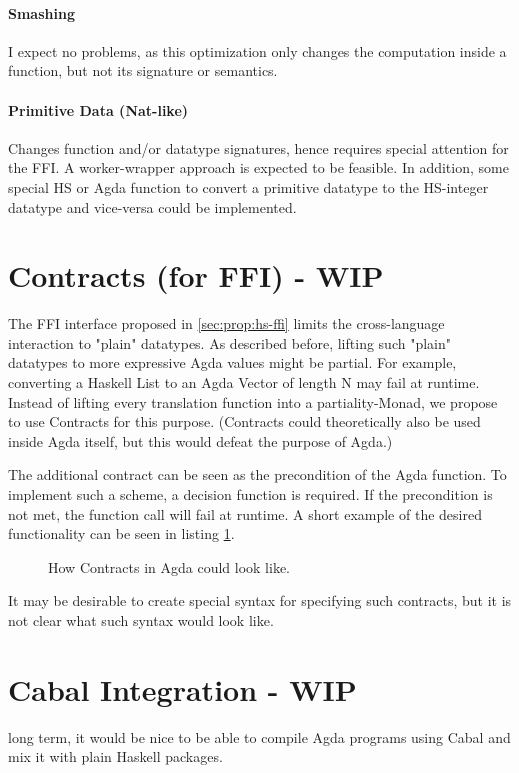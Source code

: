 \documentclass[12pt, a4paper, twoside]{report}
\begin{document}
\paragraph{Smashing}
I expect no problems, as this optimization only changes the computation inside a function, but not
its signature or semantics.

\paragraph{Primitive Data (Nat-like)}
Changes function and/or datatype signatures, hence requires special attention for the FFI.
A worker-wrapper approach is expected to be feasible. In addition, some special
HS or Agda function to convert a primitive datatype to the HS-integer datatype and vice-versa could be
implemented.

\section{Contracts (for FFI) - WIP}
The FFI interface proposed in \ref{sec:prop:hs-ffi} limits the cross-language interaction
to "plain" datatypes. As described before, lifting such "plain" datatypes to more expressive
Agda values might be partial. For example, converting a Haskell List to an Agda Vector
of length N may fail at runtime. Instead of lifting every translation function into
a partiality-Monad, we propose to use Contracts for this purpose. (Contracts could
theoretically also be used inside Agda itself, but this would defeat the purpose of Agda.)

The additional contract can be seen as the precondition of the Agda function. To implement such a
scheme, a decision function is required. If the precondition is not met, the function call
will fail at runtime. A short example of the desired functionality can be seen in listing \ref{lst:agda-con-ex}.

\begin{figure}

\caption{How Contracts in Agda could look like.}
\label{lst:agda-con-ex}
\end{figure}

It may be desirable to create special syntax for specifying such contracts, but it is
not clear what such syntax would look like.

\section{Cabal Integration - WIP}
long term, it would be nice to be able to compile Agda programs using Cabal and
mix it with plain Haskell packages.
\end{document}
